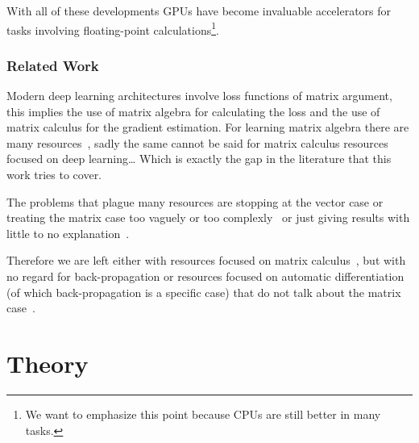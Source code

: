 \documentclass{sapthesis}
\begin{document}
With all of these developments GPUs have become invaluable accelerators for tasks
involving floating-point calculations\footnote{We want to emphasize this point
because CPUs are still better in many tasks.}.


\section{Related Work}

Modern deep learning architectures involve loss functions of matrix argument,
this implies the use of matrix algebra for calculating the loss and the use of
matrix calculus for the gradient estimation. For learning matrix algebra there
are many resources~\cite{strang2019,searle2017,magnus2005}, sadly the same
cannot be said for matrix calculus resources focused on  deep learning\dots
Which is exactly the gap in the literature that this work tries to cover.

The problems that plague many resources are stopping at the vector case or
treating the matrix case too vaguely or too
complexly~\cite{giering1998,buithanh2023} or just giving results with little to
no explanation~\cite{giles2008}.

Therefore we are left either with resources focused on matrix
calculus~\cite{magnus2019,turkington2001}, but with no regard for
back-propagation or resources focused on automatic differentiation (of which
back-propagation is a specific case) that do not talk about the matrix
case~\cite{griewank2008, naumann2011}.

\part{Theory}

\iffalse
\chapter{Contribution}

We provide the first self contained explanation of the back-propagation
algorithm for scalar functions containing matrix expressions and the matrix
calculus necessary to derive the formulas needed for an efficient implementation
of the gradient accumulation. To keep the explanation short and focused on the
deep learning use case we avoid introducing unnecessary concepts from the
automatic differentiation literature (i.e. forward-mode gradient accumulation.)
Since we present back-propagation together with matrix calculus we always use a
layout convention for derivatives and focus our description on the
back-propagation use-case. The matrix calculus literature has not reached a
consensus on which layout to use, hence making it difficult to translate results
between resources. We also include a discussion on broadcasting which is not
usually discussed in either automatic differentiation or matrix calculus
literature but it is commonly used in deep learning.
\fi
\end{document}
